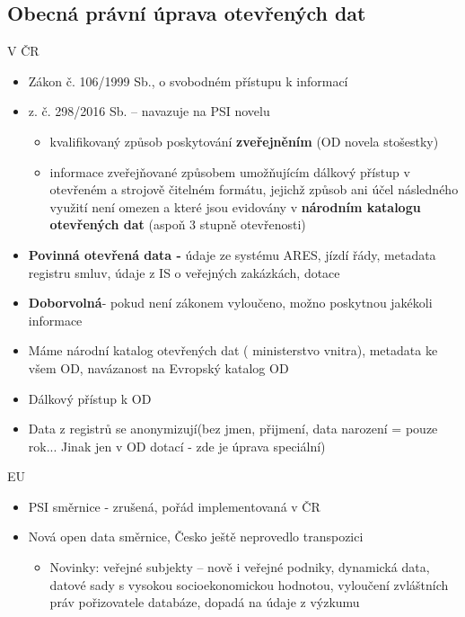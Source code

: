 \subsection{Obecná právní úprava otevřených dat}
V ČR
\begin{itemize}
      \item Zákon č. 106/1999 Sb., o svobodném přístupu k informací
      \item {} z. č. 298/2016 Sb. – navazuje na PSI novelu
            \begin{itemize}
                  \item kvalifikovaný způsob poskytování \textbf{zveřejněním} (OD novela stošestky)
                  \item informace zveřejňované způsobem umožňujícím dálkový přístup v otevřeném
                        a strojově čitelném formátu, jejichž způsob ani účel následného využití není omezen
                        a které jsou evidovány v \textbf{národním katalogu otevřených dat} (aspoň 3 stupně otevřenosti)
            \end{itemize}
      \item \textbf{Povinná otevřená data - }údaje ze systému ARES, jízdí řády, metadata registru smluv, údaje z IS o veřejných zakázkách, dotace
      \item \textbf{Doborvolná}- pokud není zákonem vyloučeno, možno poskytnou jakékoli informace
      \item Máme národní katalog otevřených dat ( ministerstvo vnitra), metadata ke všem OD, navázanost na Evropský katalog OD
      \item Dálkový přístup k OD
      \item Data z registrů se anonymizují(bez jmen, přijmení, data narození = pouze rok... Jinak jen v OD dotací - zde je úprava speciální)
\end{itemize}
EU
\begin{itemize}
      \item PSI směrnice - zrušená, pořád implementovaná v ČR
      \item Nová open data směrnice, Česko ještě neprovedlo transpozici
            \begin{itemize}
                  \item Novinky: veřejné subjekty – nově i veřejné podniky, dynamická data, datové sady
                        s vysokou socioekonomickou hodnotou, vyloučení zvláštních práv pořizovatele
                        databáze, dopadá na údaje z výzkumu
            \end{itemize}
\end{itemize}


